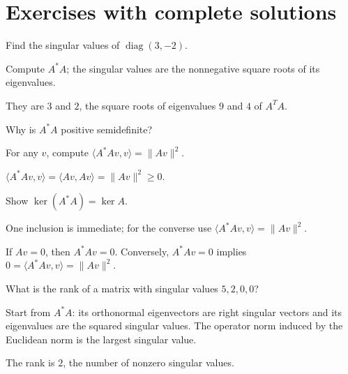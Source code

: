 
\section{Exercises with complete solutions}

\begin{exercise}\label{exr:i18-01}
Find the singular values of $\operatorname{diag}(3,-2)$.
\end{exercise}
\begin{hint}
Compute \(A^*A\); the singular values are the nonnegative square roots of its eigenvalues.
\end{hint}
\begin{solution}
They are $3$ and $2$, the square roots of eigenvalues $9$ and $4$ of $A^TA$.
\end{solution}

\begin{exercise}\label{exr:i18-02}
Why is $A^*A$ positive semidefinite?
\end{exercise}
\begin{hint}
For any \(v\), compute \(\langle A^*Av,v\rangle=\|Av\|^2\).
\end{hint}
\begin{solution}
$\langle A^*Av,v\rangle=\langle Av,Av\rangle=\|Av\|^2\ge0$.
\end{solution}

\begin{exercise}\label{exr:i18-03}
Show $\ker(A^*A)=\ker A$.
\end{exercise}
\begin{hint}
One inclusion is immediate; for the converse use \(\langle A^*Av,v\rangle=\|Av\|^2\).
\end{hint}
\begin{solution}
If $Av=0$, then $A^*Av=0$. Conversely, $A^*Av=0$ implies $0=\langle A^*Av,v\rangle=\|Av\|^2$.
\end{solution}

\begin{exercise}\label{exr:i18-04}
What is the rank of a matrix with singular values $5,2,0,0$?
\end{exercise}
\begin{hint}
Start from \(A^*A\): its orthonormal eigenvectors are right singular vectors and its eigenvalues are the squared singular values. The operator norm induced by the Euclidean norm is the largest singular value.
\end{hint}
\begin{solution}
The rank is $2$, the number of nonzero singular values.
\end{solution}

